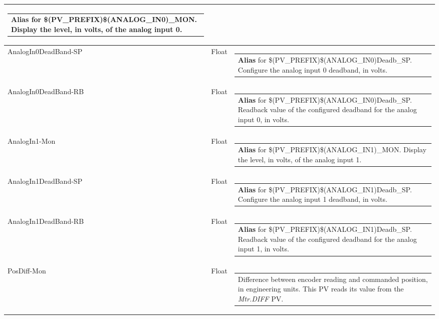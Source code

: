 \documentclass[openany]{article}
\begin{document}
\begin{longtable}{| m{4.5cm} m{2.5cm}  m{8.5cm} |}
\begin{tabular}{@{}m{6cm}@{}}
                \textbf{\color{blue} Alias} for \$(PV\_PREFIX)\$(ANALOG\_IN0)\_MON. Display the level, in volts, of the analog input 0.
            \end{tabular} \hypertarget{pv:analog-in-0-dead-band}{}\\ \hline
        AnalogIn0DeadBand-SP & Float & \begin{tabular}{@{}m{6cm}@{}}
                \textbf{\color{blue} Alias} for \$(PV\_PREFIX)\$(ANALOG\_IN0)Deadb\_SP. Configure the analog input 0 deadband, in volts.
            \end{tabular} \hypertarget{}{}\\ \hline
        AnalogIn0DeadBand-RB & Float & \begin{tabular}{@{}m{6cm}@{}}
                \textbf{\color{blue} Alias} for \$(PV\_PREFIX)\$(ANALOG\_IN0)Deadb\_SP. Readback value of the configured deadband for the analog input 0, in volts.
            \end{tabular} \hypertarget{pv:analog-in-1-mon}{}\\ \hline
        AnalogIn1-Mon & Float & \begin{tabular}{@{}m{6cm}@{}}
                \textbf{\color{blue} Alias} for \$(PV\_PREFIX)\$(ANALOG\_IN1)\_MON. Display the level, in volts, of the analog input 1.
            \end{tabular} \hypertarget{pv:analog-in-1-dead-band}{}\\ \hline
        AnalogIn1DeadBand-SP & Float & \begin{tabular}{@{}m{6cm}@{}}
                \textbf{\color{blue} Alias} for \$(PV\_PREFIX)\$(ANALOG\_IN1)Deadb\_SP. Configure the analog input 1 deadband, in volts.
            \end{tabular} \hypertarget{}{}\\ \hline
        AnalogIn1DeadBand-RB & Float & \begin{tabular}{@{}m{6cm}@{}}
                \textbf{\color{blue} Alias} for \$(PV\_PREFIX)\$(ANALOG\_IN1)Deadb\_SP. Readback value of the configured deadband for the analog input 1, in volts.
            \end{tabular} \hypertarget{pv:pos-diff-mon}{}\\ \hline
        PosDiff-Mon & Float & \begin{tabular}{@{}m{6cm}@{}}
                Difference between encoder reading and commanded position, in engineering units. This PV reads its value from the \emph{Mtr.DIFF} PV.

\end{tabular}
\end{longtable}
\end{document}
